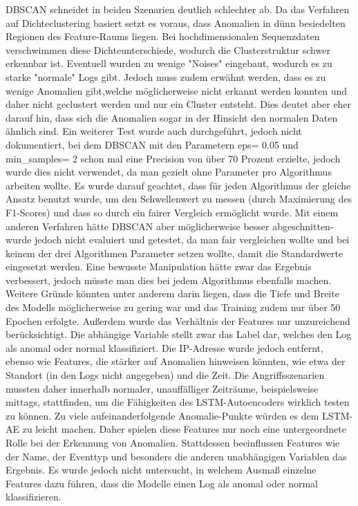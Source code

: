 \documentclass[a4paper,12pt]{article}
\begin{document}
	DBSCAN schneidet in beiden Szenarien deutlich schlechter ab. Da das Verfahren  auf Dichteclustering basiert setzt es voraus, dass Anomalien in dünn besiedelten Regionen des Feature-Raums liegen. Bei hochdimensionalen Sequenzdaten verschwimmen diese Dichteunterschiede, wodurch die Clusterstruktur schwer erkennbar ist. Eventuell wurden zu wenige "Noises" eingebaut, wodurch es zu starke "normale" Logs gibt. Jedoch muss zudem erwähnt werden, dass es zu wenige Anomalien gibt,welche möglicherweise nicht erkannt werden konnten und daher nicht geclustert werden und nur ein Cluster entsteht. Dies deutet aber eher darauf hin, dass sich die Anomalien sogar in der Hinsicht den normalen Daten ähnlich sind. Ein weiterer Test wurde auch durchgeführt, jedoch nicht dokumentiert, bei dem DBSCAN mit den Parametern eps= 0.05 und min\_samples= 2 schon mal eine Precision von über 70 Prozent erzielte, jedoch wurde dies nicht verwendet, da man gezielt ohne Parameter pro Algorithmus arbeiten wollte. Es wurde darauf geachtet, dass für jeden Algorithmus der gleiche Ansatz benutzt wurde, um den Schwellenwert zu messen (durch Maximierung des F1-Scores) und dass so durch ein fairer Vergleich ermöglicht wurde. Mit einem anderen Verfahren hätte DBSCAN aber möglicherweise besser abgeschnitten- wurde jedoch nicht evaluiert und getestet, da man fair vergleichen wollte und bei keinem der drei Algorithmen Parameter setzen wollte, damit die Standardwerte eingesetzt werden. Eine bewusste Manipulation hätte zwar das Ergebnis verbessert, jedoch müsste man dies bei jedem Algorithmus ebenfalls machen.
	\\[0.5em]
	Weitere Gründe könnten unter anderem darin liegen, dass die Tiefe und Breite des Modells möglicherweise zu gering war und das Training zudem nur über 50 Epochen erfolgte. Außerdem wurde das Verhältnis der Features nur unzureichend berücksichtigt. Die abhängige Variable stellt zwar das Label dar, welches den Log als anomal oder normal klassifiziert. Die IP-Adresse wurde jedoch entfernt, ebenso wie Features, die stärker auf Anomalien hinweisen könnten, wie etwa der Standort (in den Logs nicht angegeben) und die Zeit. Die Angriffsszenarien mussten daher innerhalb normaler, unauffälliger Zeiträume, beispielsweise mittags, stattfinden, um die Fähigkeiten des LSTM-Autoencoders wirklich testen zu können. Zu viele aufeinanderfolgende Anomalie-Punkte würden es dem LSTM-AE zu leicht machen. Daher spielen diese Features nur noch eine untergeordnete Rolle bei der Erkennung von Anomalien. Stattdessen beeinflussen Features wie der Name, der Eventtyp und besonders die anderen unabhängigen Variablen das Ergebnis. Es wurde jedoch nicht untersucht, in welchem Ausmaß einzelne Features dazu führen, dass die Modelle einen Log als anomal oder normal klassifizieren.
\end{document}
